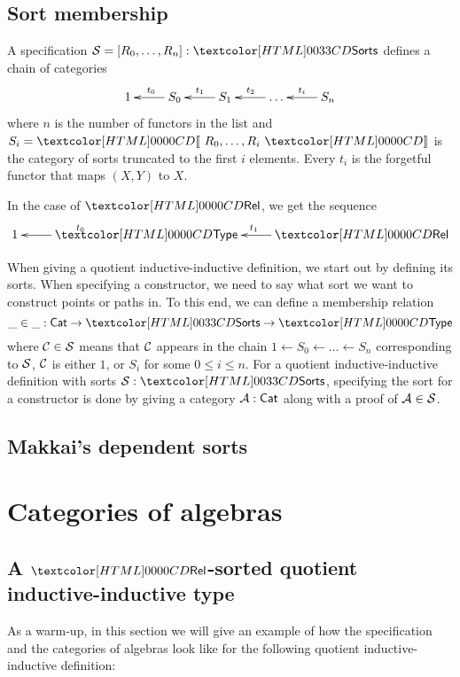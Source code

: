 \subsection{Sort membership}

A specification $\Ss = [R_0, \ldots, R_n] : \sortsty$ defines a chain of categories
\[
\xymatrix{
1 &S_0 \ar[l]_{t_0} &S_1 \ar[l]_{t_1} &\hdots \ar[l]_{t_2} &S_n \ar[l]_{t_i}
}
\]
where $n$ is the number of functors in the list and
$S_i = \SortCat{R_0, \ldots, R_i}$ is the category of sorts truncated
to the first $i$ elements. Every $t_i$ is the forgetful functor that
maps $(X,Y)$ to $X$.

\begin{example}
In the case of $\Rel$, we get the sequence
\[
\xymatrix{
1 &\Type \ar[l]_{t_0} &\Rel \ar[l]_{t_1}
}
\]
\end{example}

When giving a quotient inductive-inductive definition, we start out by
defining its sorts. When specifying a constructor, we need to say what
sort we want to construct points or paths in. To this end, we can
define a membership relation
\[
  \_ \in \_ : \Cat \to \sortsty \to \Type
\]
where $\mathcal{C} \in \mathcal{S}$ means that $\mathcal{C}$ appears in the chain
${1 \leftarrow S_0 \leftarrow \ldots \leftarrow S_n}$ corresponding to
$\mathcal{S}$, \ie $\mathcal{C}$ is either $1$, or $S_i$ for some $0 \leq i \leq
n$.
For a quotient inductive-inductive definition with sorts
$\Ss : \sortsty$, specifying the sort for a constructor is done by
giving a category $\mathcal{A} : \mathsf{Cat}$ along with a proof of $\mathcal{A} \in \mathcal{S}$.

\subsection{Makkai's dependent sorts}

\section{Categories of algebras}

\subsection{A $\Rel$-sorted quotient inductive-inductive type}

As a warm-up, in this section we will give an example of how the
specification and the categories of algebras look like for the
following quotient inductive-inductive definition:
%
\begin{sorts}
  \sortnamety{\Aty}{\Set} \\
  \sortnamety{\Bty}{\Aty \to \Aty \to \Set}
\end{sorts}
%
\begin{datatype}{\Aty}{}
  \constr{\Aco}{\Aty} \\
  \constr{\Aci}{\Aty}
\end{datatype}
%
\begin{datatype}{\Bty}{}
  \constr{\Bcii}{\natty \to \Bty\ \Aco\ \Aci} \\
\end{datatype}

